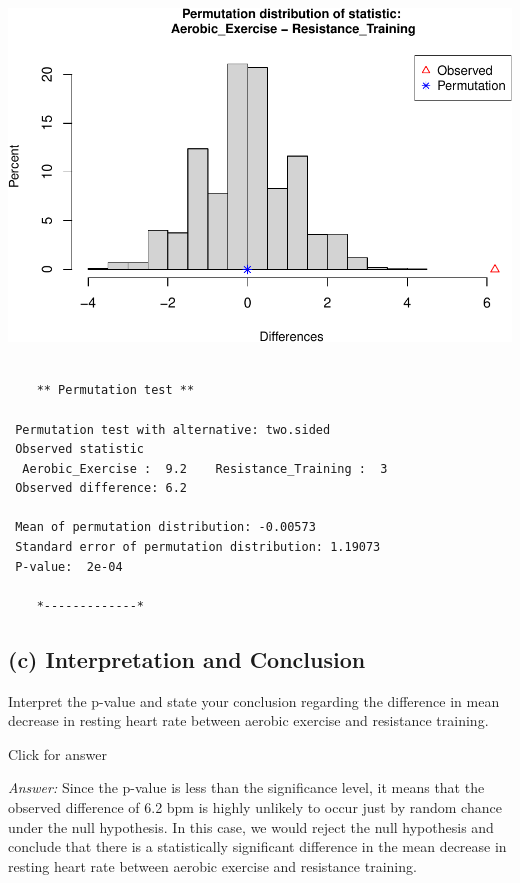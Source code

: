\documentclass[
]{book}
\begin{document}
\includegraphics[width=1\linewidth]{Class_Activity_13_files/figure-latex/unnamed-chunk-1-1}

\begin{verbatim}

    ** Permutation test **

 Permutation test with alternative: two.sided 
 Observed statistic
  Aerobic_Exercise :  9.2    Resistance_Training :  3 
 Observed difference: 6.2 

 Mean of permutation distribution: -0.00573 
 Standard error of permutation distribution: 1.19073 
 P-value:  2e-04 

    *-------------*
\end{verbatim}

\hypertarget{c-interpretation-and-conclusion}{%
\subsection{(c) Interpretation and Conclusion}\label{c-interpretation-and-conclusion}}

Interpret the p-value and state your conclusion regarding the difference in mean decrease in resting heart rate between aerobic exercise and resistance training.

Click for answer

\emph{Answer:} Since the p-value is less than the significance level, it means that the observed difference of 6.2 bpm is highly unlikely to occur just by random chance under the null hypothesis. In this case, we would reject the null hypothesis and conclude that there is a statistically significant difference in the mean decrease in resting heart rate between aerobic exercise and resistance training.
\end{document}
